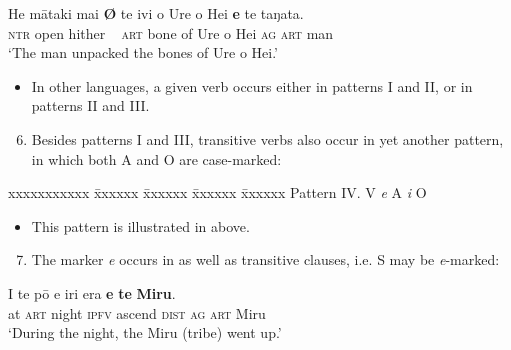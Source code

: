 \ea\label{ex:8.6}
\gll He mātaki mai  \textbf{\textup{Ø}} te ivi o Ure o Hei \textbf{e} te taŋata.\\
\textsc{ntr} open hither ~ \textsc{art} bone of Ure o Hei \textsc{ag} \textsc{art} man\\

\glt
‘The man unpacked the bones of Ure o Hei.’ \textstyleExampleref{[Blx-2-01.028]}
\z
\begin{itemize}
\item[]
In other languages, a given verb occurs either in patterns I and II, or in patterns II and III.
\end{itemize}

\begin{enumerate}
\setcounter{enumi}{5}

\item 
Besides patterns I and III, transitive verbs also occur in yet another pattern, in which both A and O are case-marked:
\end{enumerate}

\ea\label{ex:8.1d}
\begin{tabbing}
xxxxxxxxxxx \= xxxxxx \= xxxxxx \=  xxxxxx \= xxxxxx \kill
Pattern IV. \> V \> \textit{e} A \> \textit{i} O
\end{tabbing}
\z

\begin{itemize}
\item[]
This pattern is illustrated in  above. 
\end{itemize}

\begin{enumerate}
\setcounter{enumi}{6}
\item 
The  marker \textit{e} occurs in  as well as transitive clauses, i.e. S may be \textit{e}{}-marked:
\end{enumerate}

\ea\label{ex:8.7}
\gll {\ꞌ}I te pō e iri era \textbf{e} \textbf{te} \textbf{Miru}.\\
at \textsc{art} night \textsc{ipfv} ascend \textsc{dist} \textsc{ag} \textsc{art} Miru\\

\glt 
‘During the night, the Miru (tribe) went up.’ \textstyleExampleref{[R304.050]} 
\z

